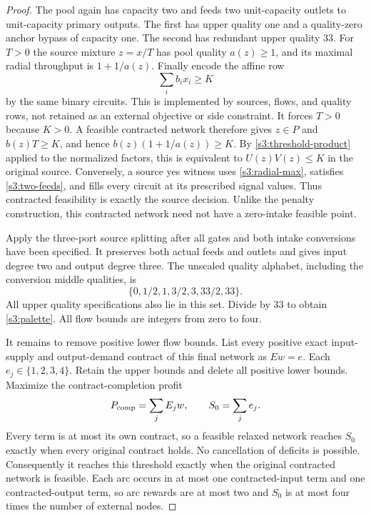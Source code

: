 \begin{proof}
The pool again has capacity two and feeds two unit-capacity outlets to
unit-capacity primary outputs. The first has upper quality one and a
quality-zero anchor bypass of capacity one. The second has redundant
upper quality 33. For $T>0$ the source mixture $z=x/T$ has pool quality
$a(z)\ge1$, and its maximal radial throughput is $1+1/a(z)$.
Finally encode the affine row
\begin{equation}
 \sum_i b_ix_i\ge K\label{s3:physical-threshold}
\end{equation}
by the same binary circuits. This is implemented by sources, flows, and
quality rows, not retained as an external objective or side constraint.
It forces $T>0$ because $K>0$. A feasible contracted network therefore
gives $z\in P$ and $b(z)T\ge K$, and hence
$b(z)(1+1/a(z))\ge K$. By \eqref{s3:threshold-product} applied to
the normalized factors, this is equivalent to $U(z)V(z)\le K$ in the
original source. Conversely, a source yes witness uses
\eqref{s3:radial-max}, satisfies \eqref{s3:two-feeds}, and fills every
circuit at its prescribed signal values. Thus contracted feasibility is
exactly the source decision. Unlike the penalty construction, this
contracted network need not have a zero-intake feasible point.

Apply the three-port source splitting after all gates and both intake
conversions have been specified. It preserves both actual feeds and
outlets and gives input degree two and output degree three. The
unscaled quality alphabet, including the conversion middle qualities,
is
\[
 \{0,1/2,1,3/2,3,33/2,33\}.
\]
All upper quality specifications also lie in this set. Divide by 33 to
obtain \eqref{s3:palette}. All flow bounds are integers from zero to four.

It remains to remove positive lower flow bounds. List every positive
exact input-supply and output-demand contract of this final network as
$Ew=e$. Each $e_j\in\{1,2,3,4\}$. Retain the upper bounds and delete
all positive lower bounds. Maximize the contract-completion profit
\begin{equation}
 P_{\rm comp}=\sum_j E_jw,\qquad
 S_0=\sum_j e_j.\label{s3:completion}
\end{equation}
Every term is at most its own contract, so a feasible relaxed network
reaches $S_0$ exactly when every original contract holds. No cancellation
of deficits is possible. Consequently it reaches this threshold exactly
when the original contracted network is feasible. Each arc occurs in
at most one contracted-input term and one contracted-output term, so
arc rewards are at most two and $S_0$ is at most four times the number
of external nodes.


\end{proof}
